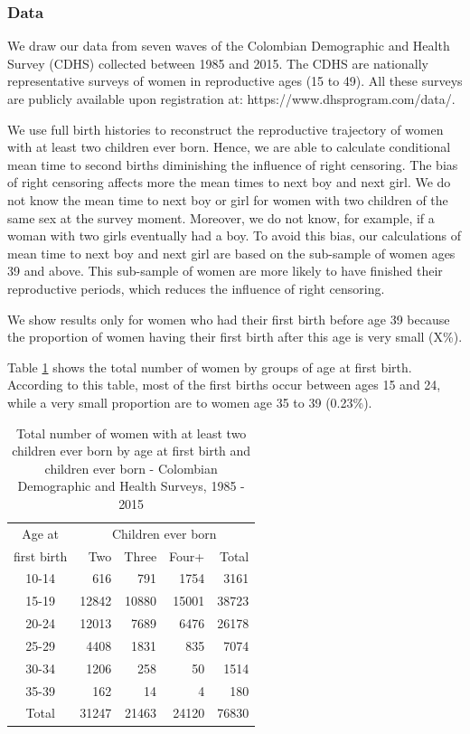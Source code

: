 \documentclass{article}
\begin{document}
\subsubsection{Data}

We draw our data from seven waves of the Colombian Demographic and Health Survey (CDHS) collected between 1985 and 2015. The CDHS are nationally representative surveys of women in reproductive ages (15 to 49). All these surveys are publicly available upon registration at: https://www.dhsprogram.com/data/.

We use full birth histories to reconstruct the reproductive trajectory of women with at least two children ever born. Hence, we are able to calculate conditional mean time to second births diminishing the influence of right censoring. The bias of right censoring affects more the mean times to next boy and next girl. We do not know the mean time to next boy or girl for women with two children of the same sex at the survey moment. Moreover, we do not know, for example, if a woman with two girls eventually had a boy. To avoid this bias, our calculations of mean time to next boy and next girl are based on the sub-sample of women ages 39 and above. This sub-sample of women are more likely to have finished their reproductive periods, which reduces the influence of right censoring.

We show results only for women who had their first birth before age 39 because the proportion of women having their first birth after this age is very small (X\%).

Table \ref{tfert_01} shows the total number of women by groups of age at first birth. According to this table, most of the first births occur between ages 15 and 24, while a very small proportion are to women age 35 to 39 (0.23\%). 

\begin{table}[ht]
\centering
\caption{Total number of women with at least two children ever born by age at first birth and children ever born - Colombian Demographic and Health Surveys, 1985 - 2015}
\begin{tabular}{crrrr}
  \hline
Age at  & \multicolumn{4}{c}{Children ever born} \\ 
first birth & Two & Three & Four+ & Total \\ 
  \hline
10-14 & 616 & 791 & 1754 & 3161 \\ 
  15-19 & 12842 & 10880 & 15001 & 38723 \\ 
  20-24 & 12013 & 7689 & 6476 & 26178 \\ 
  25-29 & 4408 & 1831 & 835 & 7074 \\ 
  30-34 & 1206 & 258 & 50 & 1514 \\ 
  35-39 & 162 & 14 & 4 & 180 \\\hline 
  Total & 31247 & 21463 & 24120 & 76830 \\ 
   \hline
\end{tabular}
\label{tfert_01}
\end{table}
\end{document}
